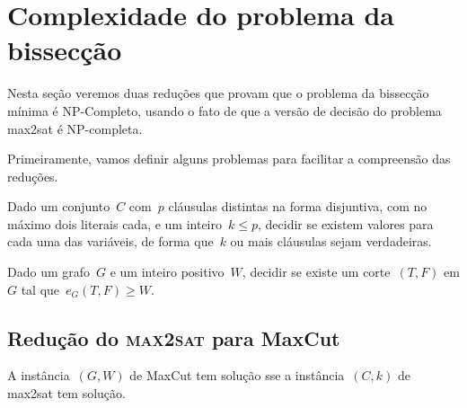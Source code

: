 \section {Complexidade do problema da bissecção}
	Nesta seção veremos duas reduções que provam que o problema 
	da bissecção mínima é NP-Completo,
	usando o fato de
	que a versão de decisão do
	problema {\sc max2sat} é NP-completa.

	Primeiramente, vamos definir alguns problemas para facilitar
	a compreensão das reduções.

	\medskip

	\begin{prob}
		Dado um conjunto~$C$ com~$p$ cláusulas distintas na forma 
		disjuntiva, com no máximo
		dois literais cada, e um inteiro~$k\le p$,
		decidir se existem valores para cada uma das variáveis, de forma
		que~$k$ ou mais cláusulas sejam verdadeiras.

	\end{prob}

	\medskip

	\begin{prob}
		Dado um grafo~${G}$
		e um inteiro positivo~${W}$, decidir se existe um
		corte~$(T,F)$ em $G$ tal 
		que~${e_G(T,F)\ge W}$.
		
	\end{prob}

	

		

	\bigskip
	\bigskip
	\bigskip

	\subsection{Redução do \textbf{\textsc {max2sat}} para MaxCut}

	\begin{teo}
		A instância~$(G,W)$ de MaxCut tem solução sse
		a instância~$(C,k)$ de {\sc max2sat} tem solução.
	\end{teo}

